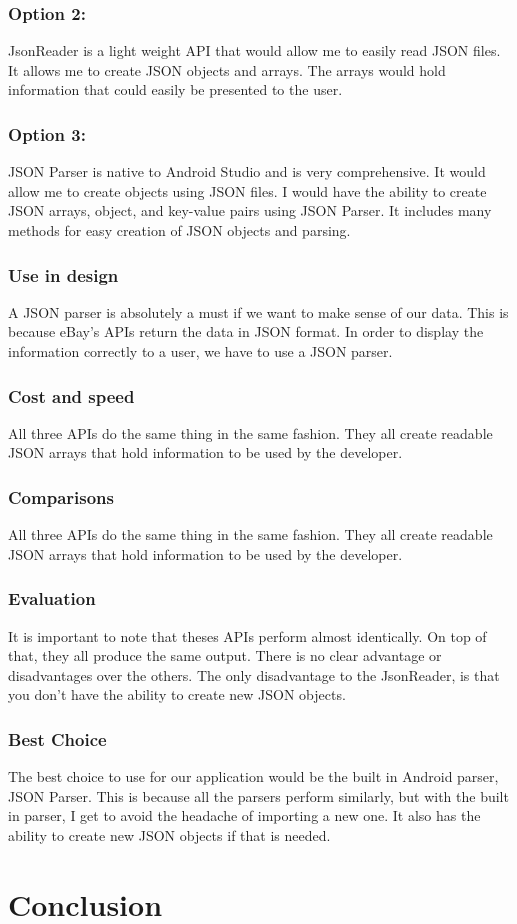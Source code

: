 \documentclass[journal,compsoc, 10pt, draftclsnofoot, onecolumn]{IEEEtran}
\begin{document}
\subsubsection*{Option 2: }
JsonReader is a light weight API that would allow me to easily read JSON files.
It allows me to create JSON objects and arrays. The arrays would hold
information that could easily be presented to the user.

\subsubsection*{Option 3: }
JSON Parser is native to Android Studio and is very comprehensive. It would
allow me to create objects using JSON files. I would have the ability to create
JSON arrays, object, and key-value pairs using JSON Parser. It includes many
methods for easy creation of JSON objects and parsing.

\subsubsection{Use in design}
A JSON parser is absolutely a must if we want to make sense of our data. This is
because eBay's APIs return the data in JSON format. In order to display the
information correctly to a user, we have to use a JSON parser.

\subsubsection{Cost and speed}
All three APIs do the same thing in the same fashion. They all create readable
JSON arrays that hold information to be used by the developer.

\subsubsection{Comparisons}
All three APIs do the same thing in the same fashion. They all create readable
JSON arrays that hold information to be used by the developer.

\subsubsection{Evaluation}
It is important to note that theses APIs perform almost identically. On top of
that, they all produce the same output. There is no clear advantage or
disadvantages over the others. The only disadvantage to the JsonReader, is that
you don't have the ability to create new JSON objects.

\subsubsection{Best Choice}
The best choice to use for our application would be the built in Android parser,
JSON Parser. This is because all the parsers perform similarly, but with the
built in parser, I get to avoid the headache of importing a new one. It also has
the ability to create new JSON objects if that is needed.

\section{Conclusion}
\end{document}
